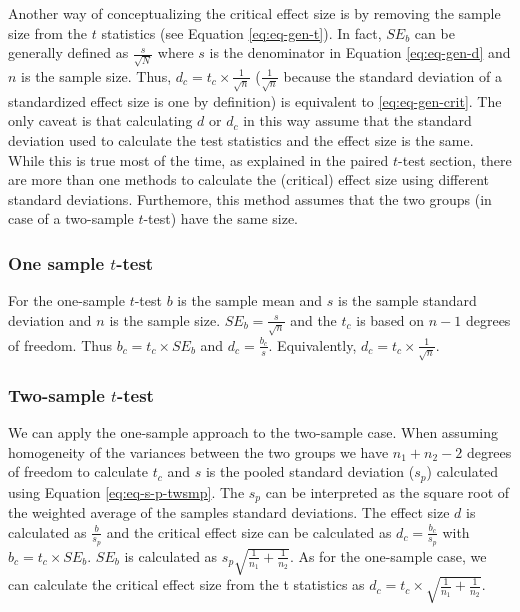 \documentclass[
  man,floatsintext]{apa7}
\begin{document}
Another way of conceptualizing the critical effect size is by removing the sample size from the \(t\) statistics (see Equation \eqref{eq:eq-gen-t}). In fact, \(SE_b\) can be generally defined as \(\frac{s}{\sqrt{N}}\) where \(s\) is the denominator in Equation \eqref{eq:eq-gen-d} and \(n\) is the sample size. Thus, \(d_c = t_c \times \frac{1}{\sqrt{n}}\) (\(\frac{1}{\sqrt{n}}\) because the standard deviation of a standardized effect size is one by definition) is equivalent to \eqref{eq:eq-gen-crit}. The only caveat is that calculating \(d\) or \(d_c\) in this way assume that the standard deviation used to calculate the test statistics and the effect size is the same. While this is true most of the time, as explained in the paired \(t\)-test section, there are more than one methods to calculate the (critical) effect size using different standard deviations. Furthemore, this method assumes that the two groups (in case of a two-sample \(t\)-test) have the same size.

\hypertarget{one-sample-t-test}{%
\subsubsection{\texorpdfstring{One sample \(t\)-test}{One sample t-test}}\label{one-sample-t-test}}

For the one-sample \(t\)-test \(b\) is the sample mean and \(s\) is the sample standard deviation and \(n\) is the sample size. \(SE_b = \frac{s}{\sqrt{n}}\) and the \(t_c\) is based on \(n - 1\) degrees of freedom. Thus \(b_c = t_c \times SE_b\) and \(d_c = \frac{b_c}{s}\). Equivalently, \(d_c = t_c \times \frac{1}{\sqrt{n}}\).

\hypertarget{two-sample-t-test}{%
\subsubsection{\texorpdfstring{Two-sample \(t\)-test}{Two-sample t-test}}\label{two-sample-t-test}}

We can apply the one-sample approach to the two-sample case. When assuming homogeneity of the variances between the two groups we have \(n_1 + n_2 - 2\) degrees of freedom to calculate \(t_c\) and \(s\) is the pooled standard deviation (\(s_p\)) calculated using Equation \eqref{eq:eq-s-p-twsmp}. The \(s_p\) can be interpreted as the square root of the weighted average of the samples standard deviations. The effect size \(d\) is calculated as \(\frac{b}{s_p}\) and the critical effect size can be calculated as \(d_c = \frac{b_c}{s_p}\) with \(b_c = t_c \times SE_b\). \(SE_b\) is calculated as \(s_p \sqrt{\frac{1}{n_1} + \frac{1}{n_2}}\). As for the one-sample case, we can calculate the critical effect size from the t statistics as \(d_c = t_c \times \sqrt{\frac{1}{n_1} + \frac{1}{n_2}}\).
\end{document}
